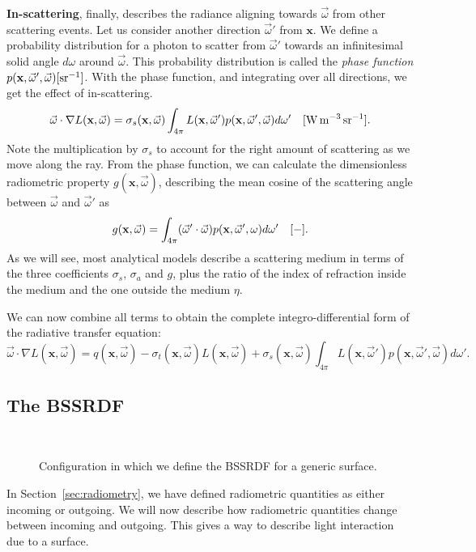 \textbf{In-scattering}, finally, describes the radiance aligning towards $\vec{\omega}$ from other scattering events. Let us consider another direction $\vec{\omega}'$ from $\mathbf{x}$. We define a probability distribution for a photon to scatter from $\vec{\omega}'$ towards an infinitesimal solid angle $d{\omega}$ around $\vec{\omega}$. This probability distribution is called the \emph{phase function}  $p(\mathbf{x}, \vec{\omega}', \vec{\omega}) \siunitnospace{ \per \steradian}$. With the phase function, and integrating over all directions, we get the effect of in-scattering.
\begin{equation*}
\vec{\omega} \cdot \nabla L(\mathbf{x}, \vec{\omega}) = \sigma_s(\mathbf{x}, \vec{\omega}) \int_{4\pi} L(\mathbf{x}, \vec{\omega}')  p(\mathbf{x}, \vec{\omega}', \vec{\omega}) d {\omega}'\siunit{\watt \per \cubic \metre \per \steradian}.
\end{equation*}
Note the multiplication by $\sigma_s$ to account for the right amount of scattering as we move along the ray. From the phase function, we can calculate the dimensionless radiometric property $g(\mathbf{x}, \vec{\omega})$, describing the mean cosine of the scattering angle between $\vec{\omega}$ and $\vec{\omega}'$ as
\begin{equation*}
g(\mathbf{x}, \vec{\omega}) = \int_{4\pi} (\vec{\omega}' \cdot \vec{\omega}) p(\mathbf{x}, \vec{\omega}', {\omega}) d{\omega}'
\ \ \ [\SI{}{-}].
\end{equation*}
As we will see, most analytical models describe a scattering medium in terms of the three coefficients $\sigma_s$, $\sigma_a$ and $g$, plus the ratio of the index of refraction inside the medium and the one outside the medium $\eta$.

We can now combine all terms to obtain the complete integro-differential form of the radiative transfer equation:
\begin{equation}
\label{eq:rte}
\vec{\omega} \cdot \nabla L(\mathbf{x}, \vec{\omega}) = q(\mathbf{x}, \vec{\omega}) - \sigma_t(\mathbf{x}, \vec{\omega}) L(\mathbf{x}, \vec{\omega}) + \sigma_s(\mathbf{x}, \vec{\omega}) \int_{4\pi} L(\mathbf{x}, \vec{\omega}')  p(\mathbf{x}, \vec{\omega}', \vec{\omega}) d {\omega}'.
\end{equation}
%
\subsection{The BSSRDF}
\begin{figure}
\centering
   \def\svgwidth{0.8\textwidth}
    \\
\caption{Configuration in which we define the BSSRDF for a generic surface.} %
\label{fig:bssrdf_configuration}
\end{figure}
%
In Section~\ref{sec:radiometry}, we have defined radiometric quantities as either incoming or outgoing. We will now describe how radiometric quantities change between incoming and outgoing. This gives a way to describe light interaction due to a surface.

